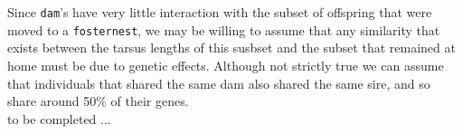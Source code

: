\documentclass{article}
\begin{document}
Since \texttt{dam}'s have very little interaction with the subset of offspring that were moved to a \texttt{fosternest}, we may be willing to assume that any similarity that exists between the tarsus lengths of this susbset and the subset  that remained at home must be due to genetic effects. Although not strictly true we can assume that individuals that shared the same dam also shared the same sire, and so share around 50\% of their genes.\\

to be completed ...\\    


\ifalone
\end{document}

